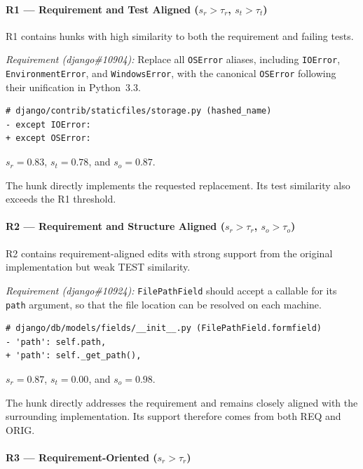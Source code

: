 \paragraph{R1 --- Requirement and Test Aligned \textnormal{($s_r>\tau_r$, $s_t>\tau_t$)}}

R1 contains hunks with high similarity to both the requirement and failing tests.

\smallskip
\noindent\textit{Requirement (django\#10904):}
Replace all \texttt{OSError} aliases, including \texttt{IOError}, \texttt{EnvironmentError}, and \texttt{WindowsError}, with the canonical \texttt{OSError} following their unification in Python~3.3.

\begin{lstlisting}
# django/contrib/staticfiles/storage.py (hashed_name)
- except IOError:
+ except OSError:
\end{lstlisting}

\noindent
$s_r=0.83$, $s_t=0.78$, and $s_o=0.87$.

The hunk directly implements the requested replacement. Its test similarity also exceeds the R1 threshold.

\paragraph{R2 --- Requirement and Structure Aligned \textnormal{($s_r>\tau_r$, $s_o>\tau_o$)}}

R2 contains requirement-aligned edits with strong support from the original implementation but weak TEST similarity.

\smallskip
\noindent\textit{Requirement (django\#10924):}
\texttt{FilePathField} should accept a callable for its \texttt{path} argument, so that the file location can be resolved on each machine.

\begin{lstlisting}
# django/db/models/fields/__init__.py (FilePathField.formfield)
- 'path': self.path,
+ 'path': self._get_path(),
\end{lstlisting}

\noindent
$s_r=0.87$, $s_t=0.00$, and $s_o=0.98$.

The hunk directly addresses the requirement and remains closely aligned with the surrounding implementation. Its support therefore comes from both REQ and ORIG.

\paragraph{R3 --- Requirement-Oriented \textnormal{($s_r>\tau_r$)}}


